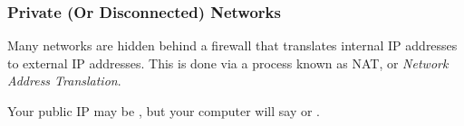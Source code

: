 \subsubsection{Private (Or Disconnected) Networks}
Many networks are hidden behind a firewall that translates internal IP addresses to external IP addresses. This is done via a process known as NAT, or \emph{Network Address Translation}.

Your public IP may be , but your computer will say  or .